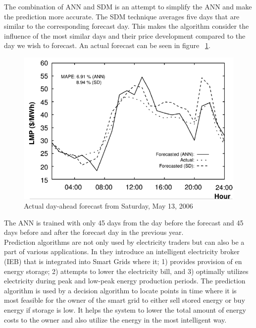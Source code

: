 The combination of ANN and SDM is an attempt to simplify the ANN and make the prediction more accurate. The SDM technique averages five days that are similar to the corresponding forecast day. This makes the algorithm consider the influence of the most similar days and their price development compared to the day we wish to forecast. An actual forecast can be seen in figure ~\ref{fig:actualForecastMay13}.
\begin{figure}[!ht]
\centering
\includegraphics[width=0.8\linewidth,natwidth=898,natheight=587]{billeder/SDMANNAccuracy.png}
\caption{Actual day-ahead forecast from Saturday, May 13, 2006 \cite{pjmForecast}}
\label{fig:actualForecastMay13}
\end{figure}
The ANN is trained with only 45 days from the day before the forecast and 45 days before and after the forecast day in the previous year.
\\[0.5cm]
Prediction algorithms are not only used by electricity traders but can also be a part of various applications. In \cite{22} they introduce an intelligent electricity broker (IEB) that is integrated into Smart Grids where it; 1) provides provision of en energy storage; 2) attempts to lower the electricity bill, and 3) optimally utilizes electricity during peak and low-peak energy production periods. The prediction algorithm is used by a decision algorithm to locate points in time where it is most feasible for the owner of the smart grid to either sell stored energy or buy energy if storage is low. It helps the system to lower the total amount of energy costs to the owner and also utilize the energy in the most intelligent way.
 